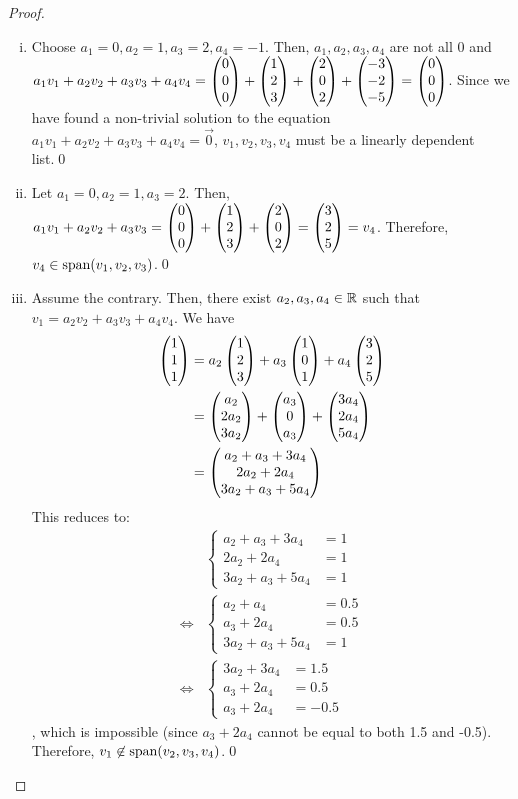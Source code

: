 \begin{proof}
    \renewcommand{\qedsymbol}{$ $}
    \begin{enumerate}[(i)]
        \renewcommand{\qedsymbol}{$\blacksquare$}
        \item Choose $a_1=0, a_2=1, a_3=2, a_4=-1$. Then, $a_1,a_2,a_3,a_4$ are not all 0 and $a_1v_1+a_2v_2+a_3v_3+a_4v_4=\begin{pmatrix} 0\\ 0\\ 0\end{pmatrix}+\begin{pmatrix} 1\\ 2\\ 3\end{pmatrix}+\begin{pmatrix} 2\\ 0\\ 2\end{pmatrix}+\begin{pmatrix} -3\\ -2\\ -5\end{pmatrix}=\begin{pmatrix} 0\\ 0\\ 0\end{pmatrix}$. Since we have found a non-trivial solution to the equation $a_1v_1+a_2v_2+a_3v_3+a_4v_4=\vec{0}$, $v_1,v_2,v_3,v_4$ must be a linearly dependent list.\qed
        \item Let $a_1=0, a_2=1, a_3=2$. Then, $a_1v_1+a_2v_2+a_3v_3=\begin{pmatrix} 0\\ 0\\ 0\end{pmatrix}+\begin{pmatrix} 1\\ 2\\ 3\end{pmatrix}+\begin{pmatrix} 2\\ 0\\ 2\end{pmatrix}=\begin{pmatrix} 3\\ 2\\ 5\end{pmatrix}=v_4$. Therefore, $v_4\in\textnormal{span}(v_1,v_2,v_3)$.\qed
        \item Assume the contrary. Then, there exist $a_2,a_3,a_4\in\mathbb R$ such that $v_1=a_2v_2+a_3v_3+a_4v_4$. We have
              \[
                  \begin{aligned}
                      \begin{pmatrix} 1\\ 1\\ 1\end{pmatrix} & = a_2 \begin{pmatrix} 1\\ 2\\ 3\end{pmatrix}+a_3 \begin{pmatrix} 1\\ 0\\ 1\end{pmatrix}+a_4 \begin{pmatrix} 3\\ 2\\ 5\end{pmatrix}          \\
                                            & = \begin{pmatrix} a_2\\ 2a_2\\ 3a_2\end{pmatrix}+\begin{pmatrix} a_3\\ 0\\ a_3\end{pmatrix}+\begin{pmatrix} 3a_4\\ 2a_4\\ 5a_4\end{pmatrix} \\
                                            & = \begin{pmatrix} a_2+a_3+3a_4\\ 2a_2+2a_4\\ 3a_2+a_3+5a_4\end{pmatrix}
                  \end{aligned}
              \]
              This reduces to:
              \begin{align*}
                   & \begin{cases}
                         a_2+a_3+3a_4  & = 1 \\
                         2a_2+2a_4     & = 1 \\
                         3a_2+a_3+5a_4 & = 1
                     \end{cases}   \\
                  \iff
                   & \begin{cases}
                         a_2+a_4       & = 0.5 \\
                         a_3+2a_4      & = 0.5 \\
                         3a_2+a_3+5a_4 & = 1
                     \end{cases} \\
                  \iff
                   & \begin{cases}
                         3a_2+3a_4 & = 1.5  \\
                         a_3+2a_4  & = 0.5  \\
                         a_3+2a_4  & = -0.5
                     \end{cases}
              \end{align*}
              , which is impossible (since $a_3+2a_4$ cannot be equal to both 1.5 and -0.5). Therefore, $v_1\not\in\textnormal{span}{(v_2,v_3,v_4)}$.\qed
    \end{enumerate}
\end{proof}